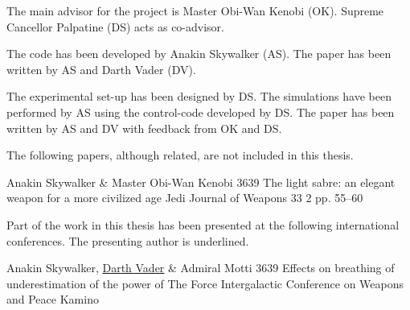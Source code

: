 %
\begin{divisionofwork}
	The main advisor for the project is Master Obi-Wan Kenobi (OK).
	Supreme Cancellor Palpatine (DS) acts as co-advisor.

	\paperitem
		The code has been developed by Anakin Skywalker (AS).
		The paper has been written by AS and Darth Vader (DV).

	\paperitem
		The experimental set-up has been designed by DS.
		The simulations have been performed by AS using the control-code
		developed by DS.
		The paper has been written by AS and DV with feedback from OK and DS.

\end{divisionofwork}


%
\begin{otherpublications}
	The following papers, although related, are not included in this thesis.

  \paperitem%
    {Anakin Skywalker \& Master Obi-Wan Kenobi}%
    {3639}%
    {The light sabre: an elegant weapon for a more civilized age}%
    {Jedi Journal of Weapons}%
    {33}%
    {2}%
    {pp. 55--60}%

\end{otherpublications}


%
\begin{conferences}
	Part of the work in this thesis has been presented at the following 
	international conferences. The presenting author is underlined.

  \conferenceitem%
    {Anakin Skywalker, \underline{Darth Vader} \& Admiral Motti}%
    {3639}%
    {Effects on breathing of underestimation of the power of The Force}%
    {Intergalactic Conference on Weapons and Peace}%
    {Kamino}%

\end{conferences}


%
\tableofcontents
